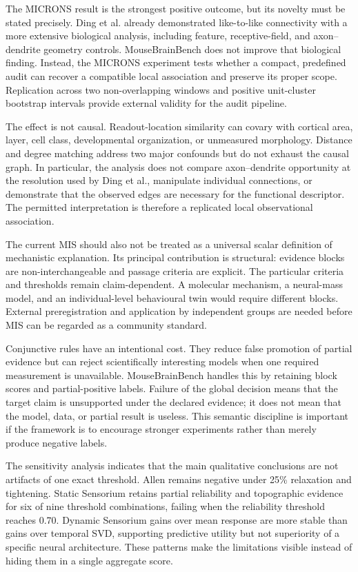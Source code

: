 The MICRONS result is the strongest positive outcome, but its novelty must be
stated precisely. Ding et al. already demonstrated like-to-like connectivity
with a more extensive biological analysis, including feature, receptive-field,
and axon--dendrite geometry controls. MouseBrainBench does not improve that
biological finding. Instead, the MICRONS experiment tests whether a compact,
predefined audit can recover a compatible local association and preserve its
proper scope. Replication across two non-overlapping windows and positive
unit-cluster bootstrap intervals provide external validity for the audit
pipeline.

The effect is not causal. Readout-location similarity can covary with cortical
area, layer, cell class, developmental organization, or unmeasured morphology.
Distance and degree matching address two major confounds but do not exhaust the
causal graph. In particular, the analysis does not compare axon--dendrite
opportunity at the resolution used by Ding et al., manipulate individual
connections, or demonstrate that the observed edges are necessary for the
functional descriptor. The permitted interpretation is therefore a replicated
local observational association.

The current MIS should also not be treated as a universal scalar definition of
mechanistic explanation. Its principal contribution is structural: evidence
blocks are non-interchangeable and passage criteria are explicit. The particular
criteria and thresholds remain claim-dependent. A molecular mechanism, a
neural-mass model, and an individual-level behavioural twin would require
different blocks. External preregistration and application by independent groups
are needed before MIS can be regarded as a community standard.

Conjunctive rules have an intentional cost. They reduce false promotion of
partial evidence but can reject scientifically interesting models when one
required measurement is unavailable. MouseBrainBench handles this by retaining
block scores and partial-positive labels. Failure of the global decision means
that the target claim is unsupported under the declared evidence; it does not
mean that the model, data, or partial result is useless. This semantic discipline
is important if the framework is to encourage stronger experiments rather than
merely produce negative labels.

The sensitivity analysis indicates that the main qualitative conclusions are
not artifacts of one exact threshold. Allen remains negative under 25\%
relaxation and tightening. Static Sensorium retains partial reliability and
topographic evidence for six of nine threshold combinations, failing when the
reliability threshold reaches 0.70. Dynamic Sensorium gains over mean response
are more stable than gains over temporal SVD, supporting predictive utility but
not superiority of a specific neural architecture. These patterns make the
limitations visible instead of hiding them in a single aggregate score.

